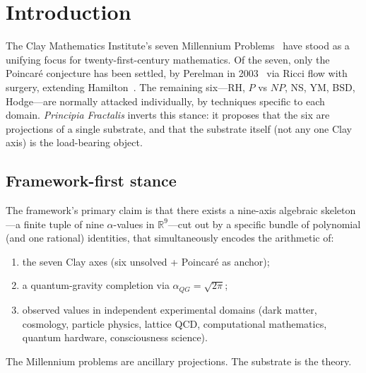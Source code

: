 \documentclass[11pt,a4paper]{amsart}
\theoremstyle{plain}
\theoremstyle{definition}
\newcommand{\Rl}{\mathbb{R}}
\newcommand{\aQG}{\alpha_{QG}}
\begin{document}
\maketitle

\tableofcontents

\section{Introduction}
\label{sec:intro}

The Clay Mathematics Institute's seven Millennium Problems~\cite{cmi2000}
have stood as a unifying focus for twenty-first-century mathematics. Of the
seven, only the Poincar\'e conjecture has been settled, by Perelman in
2003~\cite{perelman2003} via Ricci flow with surgery, extending
Hamilton~\cite{hamilton1982}. The remaining six---RH, $P$ vs $NP$, NS, YM,
BSD, Hodge---are normally attacked individually, by techniques specific to
each domain. \emph{Principia Fractalis} inverts this stance: it proposes
that the six are projections of a single substrate, and that the substrate
itself (not any one Clay axis) is the load-bearing object.

\subsection{Framework-first stance}
The framework's primary claim is that there exists a nine-axis algebraic
skeleton---a finite tuple of nine $\alpha$-values in $\Rl^{9}$---cut out by
a specific bundle of polynomial (and one rational) identities, that
simultaneously encodes the
arithmetic of:
\begin{enumerate}[label=(\roman*)]
\item the seven Clay axes (six unsolved + Poincar\'e as anchor);
\item a quantum-gravity completion via $\aQG = \sqrt{2\pi}$;
\item observed values in independent experimental domains (dark matter,
cosmology, particle physics, lattice QCD, computational mathematics,
quantum hardware, consciousness science).
\end{enumerate}
The Millennium problems are ancillary projections. The substrate is the
theory.
\end{document}
